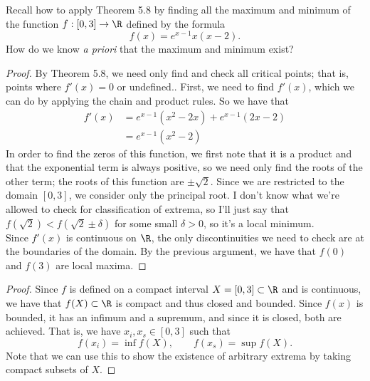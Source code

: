\documentclass{assignment}
\begin{document}
\begin{question}[3]
  Recall how to apply Theorem 5.8 by finding all the maximum and minimum of the function $f:
[0,3]\to \R$ defined by the formula $$f(x) = e^{x - 1}x(x-2).$$ How do we know \emph{a priori} that
the maximum and minimum exist?
\end{question}
\begin{proof}
  By Theorem 5.8, we need only find and check all critical points; that is, points where $f'(x) = 0$
or undefined.. First, we need to find $f'(x)$, which we can do by applying the chain and product
rules. So we have that 
\begin{align*}
  f'(x) &= e^{x-1}(x^2 - 2x) + e^{x-1}(2x - 2) \\
        &= e^{x-1} ( x^2 - 2)
\end{align*}
In order to find the zeros of this function, we first note that it is a product and that the
exponential term is always positive, so we need only find the roots of the other term; the roots of
this function are $\pm\sqrt{2}$. Since we are restricted to the domain $[0,3]$, we consider only the
principal root. I don't know what we're allowed to check for classification of extrema, so I'll just
say that $f(\sqrt{2}) < f(\sqrt{2} \pm \delta)$ for some small $\delta > 0$, so it's a local minimum.\\

Since $f'(x)$ is continuous on $\R$, the only discontinuities we need to check are at the boundaries
of the domain. By the previous argument, we have that $f(0)$ and $f(3)$ are local maxima. 
\end{proof}
\begin{proof}
  Since $f$ is defined on a compact interval $X = [0,3]\subset\R$ and is continuous, we have that 
$f(X) \subset \R$ is compact and thus closed and bounded. Since $f(x)$ is bounded, it has an infimum
and a supremum, and since it is closed, both are achieved. That is, we have $x_i, x_s \in [0,3]$
such that $$f(x_i) = \inf f(X), \qquad f(x_s) = \sup f(X).$$ Note that we can use this to show the
existence of arbitrary extrema by taking compact subsets of $X$. 
\end{proof}
\end{document}
